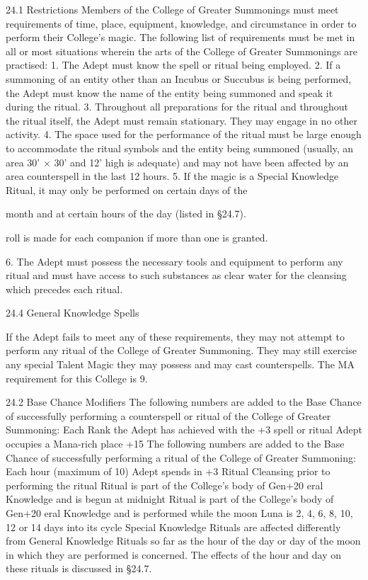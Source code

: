 \documentclass[a4paper]{article}
\begin{document}
\begin{multicols}{3}
24.1 Restrictions
Members of the College of Greater Summonings
must meet requirements of time, place, equipment, knowledge, and circumstance in order to
perform their College’s magic.
The following list of requirements must be met in
all or most situations wherein the arts of the College of Greater Summonings are practised:
1. The Adept must know the spell or ritual being
employed.
2. If a summoning of an entity other than an Incubus or Succubus is being performed, the Adept
must know the name of the entity being summoned
and speak it during the ritual.
3. Throughout all preparations for the ritual and
throughout the ritual itself, the Adept must remain
stationary. They may engage in no other activity.
4. The space used for the performance of the ritual
must be large enough to accommodate the ritual
symbols and the entity being summoned (usually,
an area 30’ × 30’ and 12’ high is adequate) and
may not have been affected by an area counterspell
in the last 12 hours.
5. If the magic is a Special Knowledge Ritual, it
may only be performed on certain days of the

month and at certain hours of the day (listed in
§24.7).

roll is made for each companion if more than one is
granted.

6. The Adept must possess the necessary tools and
equipment to perform any ritual and must have
access to such substances as clear water for the
cleansing which precedes each ritual.

24.4 General Knowledge Spells

If the Adept fails to meet any of these requirements, they may not attempt to perform any ritual
of the College of Greater Summoning. They may
still exercise any special Talent Magic they may
possess and may cast counterspells.
The MA requirement for this College is 9.

24.2 Base Chance Modifiers
The following numbers are added to the Base
Chance of successfully performing a counterspell
or ritual of the College of Greater Summoning:
Each Rank the Adept has achieved with the
+3
spell or ritual
Adept occupies a Mana-rich place
+15
The following numbers are added to the Base
Chance of successfully performing a ritual of the
College of Greater Summoning:
Each hour (maximum of 10) Adept spends in +3
Ritual Cleansing prior to performing the
ritual
Ritual is part of the College’s body of Gen+20
eral Knowledge and is begun at midnight
Ritual is part of the College’s body of Gen+20
eral Knowledge and is performed while the
moon Luna is 2, 4, 6, 8, 10, 12 or 14 days
into its cycle
Special Knowledge Rituals are affected differently
from General Knowledge Rituals so far as the hour
of the day or day of the moon in which they are
performed is concerned. The effects of the hour
and day on these rituals is discussed in §24.7.


\end{multicols}
\end{document}
